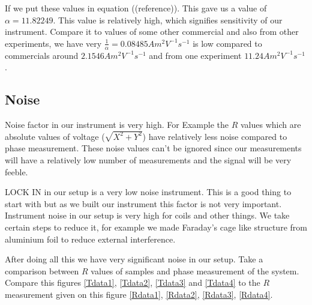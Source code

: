 If we put these values in equation ((reference)). This gave us a value of $\alpha = 11.82249$. This value is relatively high, which signifies sensitivity of our instrument. Compare it to values of some other commercial and also from other experiments, we have very $\frac{1}{\alpha}=0.08485 Am^2V^{-1}s^{-1}$ is low compared to commercials around $2.1546Am^2V^{-1}s^{-1}$ and from one experiment $11.24 Am^2V^{-1}s^{-1}$\cite{cambr}.


\subsection{Noise}
Noise factor in our instrument is very high. For Example the $R$ values which are absolute values of voltage ($\sqrt{X^2+Y^2}$) have relatively less noise compared to phase measurement. These noise values can’t be ignored since our measurements will have a relatively low number of measurements and the signal will be very feeble.

LOCK IN in our setup is a very low noise instrument. This is a good thing to start with but as we built our instrument this factor is not very important. Instrument noise in our setup is very high for coils and other things. We take certain steps to reduce it, for example we made Faraday's cage like structure from aluminium foil to reduce external interference. 

After doing all this we have very significant noise in our setup. Take a comparison between $R$ values of samples and phase measurement of the system. Compare this figures \ref{Tdata1}, \ref{Tdata2}, \ref{Tdata3} and  \ref{Tdata4} to the $R$ measurement given on this figure \ref{Rdata1}, \ref{Rdata2}, \ref{Rdata3}, \ref{Rdata4}.

